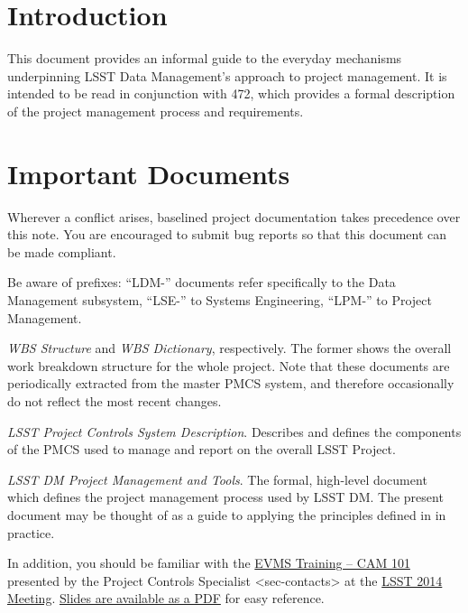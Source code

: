 \section{Introduction}
This document provides an informal guide to the everyday mechanisms
underpinning LSST Data Management's approach to project management. It
is intended to be read in conjunction with 472, which provides a formal
description of the project management process and requirements.

\section{Important Documents}\label{important-documents}

Wherever a conflict arises, baselined project documentation takes
precedence over this note. You are encouraged to submit bug reports so
that this document can be made compliant.

Be aware of prefixes: ``LDM-'' documents refer specifically to the Data
Management subsystem, ``LSE-'' to Systems Engineering, ``LPM-'' to
Project Management.

\begin{description}
	\item {}
\emph{WBS Structure} and \emph{WBS Dictionary}, respectively. The former
shows the overall work breakdown structure for the whole project. Note
that these documents are periodically extracted from the master PMCS
system, and therefore occasionally do not reflect the most recent
changes.
\item {}
\emph{LSST Project Controls System Description}. Describes and defines
the components of the PMCS used to manage and report on the overall LSST
Project.
\item {}
\emph{LSST DM Project Management and Tools}. The formal, high-level
document which defines the project management process used by LSST DM.
The present document may be thought of as a guide to applying the
principles defined in  in practice.
\end{description}

In addition, you should be familiar with the
\href{https://project.lsst.org/meetings/lsst2014/node/100}{EVMS Training
-- CAM 101} presented by the
Project Controls Specialist \textless{}sec-contacts\textgreater{} at the
\href{https://project.lsst.org/meetings/lsst2014/}{LSST 2014 Meeting}.
\href{_static/EVMS_Training.pdf}{Slides are available as a PDF} for easy
reference.

